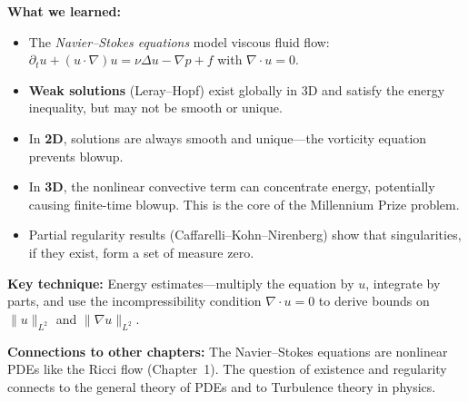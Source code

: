 \noindent\textbf{What we learned:}
\begin{itemize}
  \item The \emph{Navier--Stokes equations} model viscous fluid flow: $\partial_t u + (u \cdot \nabla)u = \nu \Delta u - \nabla p + f$ with $\nabla \cdot u = 0$.
  \item \textbf{Weak solutions} (Leray--Hopf) exist globally in 3D and satisfy the energy inequality, but may not be smooth or unique.
  \item In \textbf{2D}, solutions are always smooth and unique---the vorticity equation prevents blowup.
  \item In \textbf{3D}, the nonlinear convective term can concentrate energy, potentially causing finite-time blowup. This is the core of the Millennium Prize problem.
  \item Partial regularity results (Caffarelli--Kohn--Nirenberg) show that singularities, if they exist, form a set of measure zero.
\end{itemize}

\noindent\textbf{Key technique:} Energy estimates---multiply the equation by $u$, integrate by parts, and use the incompressibility condition $\nabla \cdot u = 0$ to derive bounds on $\|u\|_{L^2}$ and $\|\nabla u\|_{L^2}$.

\noindent\textbf{Connections to other chapters:} The Navier--Stokes equations are nonlinear PDEs like the Ricci flow (Chapter~1). The question of existence and regularity connects to the general theory of PDEs and to Turbulence theory in physics.
